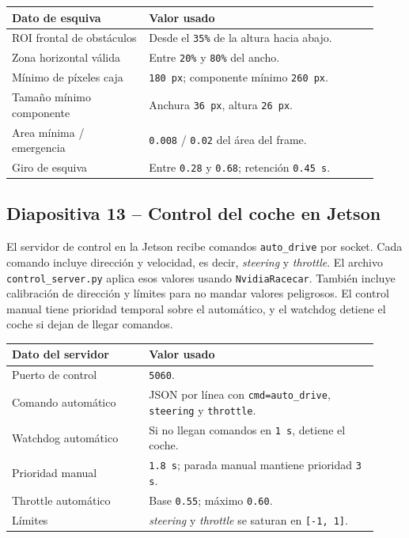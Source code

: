 \documentclass[a4paper,11pt]{article}
\begin{document}
\begin{center}
\centering
\footnotesize
\begin{tabular}{@{}L{0.34\linewidth}L{0.58\linewidth}@{}}
\toprule
\textbf{Dato de esquiva} & \textbf{Valor usado} \\
\midrule
ROI frontal de obst\'aculos & Desde el \texttt{35\%} de la altura hacia abajo. \\
Zona horizontal v\'alida & Entre \texttt{20\%} y \texttt{80\%} del ancho. \\
M\'inimo de p\'ixeles caja & \texttt{180 px}; componente m\'inimo \texttt{260 px}. \\
Tama\~no m\'inimo componente & Anchura \texttt{36 px}, altura \texttt{26 px}. \\
Area m\'inima / emergencia & \texttt{0.008} / \texttt{0.02} del \'area del frame. \\
Giro de esquiva & Entre \texttt{0.28} y \texttt{0.68}; retenci\'on \texttt{0.45 s}. \\
\bottomrule
\end{tabular}
\end{center}

\subsection*{Diapositiva 13 -- Control del coche en Jetson}
El servidor de control en la Jetson recibe comandos \texttt{auto\_drive} por socket. Cada comando incluye direcci\'on y velocidad, es decir, \textit{steering} y \textit{throttle}. El archivo \texttt{control\_server.py} aplica esos valores usando \texttt{NvidiaRacecar}. Tambi\'en incluye calibraci\'on de direcci\'on y l\'imites para no mandar valores peligrosos. El control manual tiene prioridad temporal sobre el autom\'atico, y el watchdog detiene el coche si dejan de llegar comandos.

\begin{center}
\centering
\footnotesize
\begin{tabular}{@{}L{0.34\linewidth}L{0.58\linewidth}@{}}
\toprule
\textbf{Dato del servidor} & \textbf{Valor usado} \\
\midrule
Puerto de control & \texttt{5060}. \\
Comando autom\'atico & JSON por l\'inea con \texttt{cmd=auto\_drive}, \texttt{steering} y \texttt{throttle}. \\
Watchdog autom\'atico & Si no llegan comandos en \texttt{1 s}, detiene el coche. \\
Prioridad manual & \texttt{1.8 s}; parada manual mantiene prioridad \texttt{3 s}. \\
Throttle autom\'atico & Base \texttt{0.55}; m\'aximo \texttt{0.60}. \\
L\'imites & \textit{steering} y \textit{throttle} se saturan en \texttt{[-1, 1]}. \\
\bottomrule
\end{tabular}
\end{center}
\end{document}
